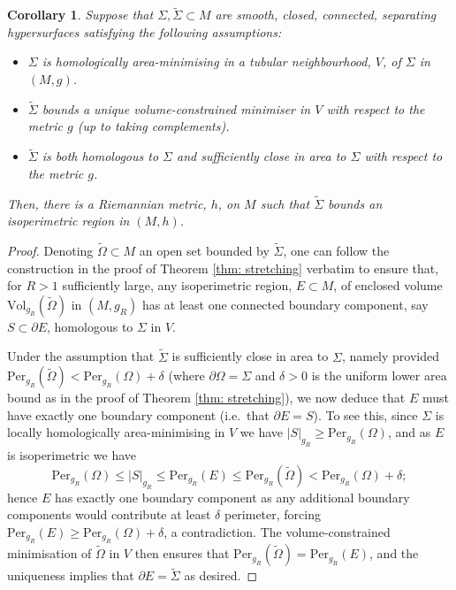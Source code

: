 \documentclass[12pt]{article}
\newtheorem{corollary}{Corollary}
\begin{document}
\begin{corollary}\label{cor: stretching for vcm}  
    Suppose that $\Sigma,\widetilde{\Sigma} \subset M$ are smooth, closed, connected, separating hypersurfaces satisfying the following assumptions:
    
    \begin{itemize}
        \item $\Sigma$ is homologically area-minimising in a tubular neighbourhood, $V$, of $\Sigma$ in $(M,g)$.

        \item $\widetilde{\Sigma}$ bounds a unique volume-constrained minimiser in $V$ with respect to the metric $g$ (up to taking complements).

        \item $\widetilde{\Sigma}$ is both homologous to $\Sigma$ and sufficiently close in area to $\Sigma$ with respect to the metric $g$. 
    \end{itemize}
    Then, there is a Riemannian metric, $h$, on $M$ such that $\widetilde{\Sigma}$ bounds an isoperimetric region in $(M,h)$.
\end{corollary}

\begin{proof}
    Denoting $\widetilde{\Omega} \subset M$ an open set bounded by $\widetilde{\Sigma}$, one can follow the construction in the proof of Theorem \ref{thm: stretching} verbatim to ensure that, for $R > 1$ sufficiently large, any isoperimetric region, $E \subset M$, of enclosed volume $\mathrm{Vol}_{g_R}(\widetilde{\Omega})$ in $(M,g_R)$ has at least one connected boundary component, say $S \subset \partial E$, homologous to $\Sigma$ in $V$.
    
    \bigskip
    
    Under the assumption that $\widetilde{\Sigma}$ is sufficiently close in area to $\Sigma$, namely provided
    $\mathrm{Per}_{g_R}(\widetilde{\Omega}) < \mathrm{Per}_{g_R}(\Omega) + \delta$ (where $\partial \Omega = \Sigma$ and $\delta > 0$ is the uniform lower area bound as in the proof of Theorem \ref{thm: stretching}), we now deduce that $E$ must have exactly one boundary component (i.e.~that $\partial E = S$). To see this, since $\Sigma$ is locally homologically area-minimising in $V$ we have $|S|_{g_R} \geq \mathrm{Per}_{g_R}(\Omega)$, and as $E$ is isoperimetric we have 
    $$\mathrm{Per}_{g_R}(\Omega) \leq |S|_{g_R} \leq \mathrm{Per}_{g_R}(E) \leq \mathrm{Per}_{g_R}(\widetilde{\Omega}) < \mathrm{Per}_{g_R}(\Omega) + \delta;$$
    hence $E$ has exactly one boundary component as any additional boundary components would contribute at least $\delta$ perimeter, forcing $\mathrm{Per}_{g_R}(E) \geq \mathrm{Per}_{g_R}(\Omega) + \delta$, a contradiction. The volume-constrained minimisation of $\widetilde{\Omega}$ in $V$ then ensures that $\mathrm{Per}_{g_R}(\widetilde{\Omega}) = \mathrm{Per}_{g_R}(E)$, and the uniqueness implies that $\partial E = \widetilde{\Sigma}$ as desired.
\end{proof}
\end{document}
